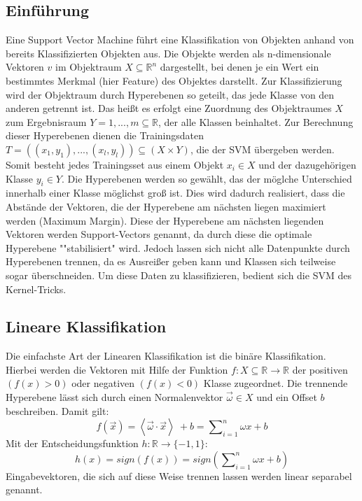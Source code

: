 \subsection{Einführung}
Eine Support Vector Machine führt eine Klassifikation von Objekten anhand von bereits Klassifizierten Objekten aus. Die Objekte werden als n-dimensionale Vektoren $v$ im Objektraum $X \subseteq \mathbb{R}^{n} $ dargestellt, bei denen je ein Wert ein bestimmtes Merkmal (hier Feature) des Objektes darstellt. Zur Klassifizierung wird der Objektraum durch Hyperebenen so geteilt, das jede Klasse von den anderen getrennt ist. Das heißt es erfolgt eine Zuordnung des Objektraumes $X$ zum Ergebnisraum $Y = {1,...,m} \subseteq \mathbb{R}$, der alle Klassen beinhaltet. Zur Berechnung dieser Hyperebenen dienen die Trainingsdaten $T =((x_{1},y_{1}),...,(x_{l},y_{l})) \subseteq (X \times Y)$, die der SVM übergeben werden. Somit besteht jedes Trainingsset aus einem Objekt $x_{i} \in X$ und der dazugehörigen Klasse $y_{i} \in Y$. Die Hyperebenen werden so gewählt, das der möglche Unterschied innerhalb einer Klasse möglichst groß ist. Dies wird dadurch realisiert, dass die Abstände der Vektoren, die der Hyperebene am nächsten liegen maximiert werden (Maximum Margin). Diese der Hyperebene am nächsten liegenden Vektoren werden Support-Vectors genannt, da durch diese die optimale Hyperebene ""stabilisiert" wird. Jedoch lassen sich nicht alle Datenpunkte durch Hyperebenen trennen, da es Ausreißer geben kann und Klassen sich teilweise sogar überschneiden. Um diese Daten zu klassifizieren, bedient sich die SVM des Kernel-Tricks.

\subsection{Lineare Klassifikation}
Die einfachste Art der Linearen Klassifikation ist die binäre Klassifikation. Hierbei werden die Vektoren mit Hilfe der Funktion $ f: X \subseteq \mathbb{R} \rightarrow \mathbb{R} $ der positiven $ (f(x)>0) $ oder negativen $ (f(x)<0) $ Klasse zugeordnet. Die trennende Hyperebene lässt sich durch einen Normalenvektor $\vec{\omega} \in X$ und ein Offset $b$ beschreiben.
Damit gilt:\[ f(\vec{x})=\left\langle \vec{\omega} \cdot \vec{x} \right\rangle\ + b = \sum\nolimits_{i=1}^n \omega x + b \]
Mit der Entscheidungsfunktion $h : \mathbb{R} \rightarrow \{-1,1\}$:
\[ h(x) = sign(f(x)) = sign (\sum\nolimits_{i=1}^n \omega x + b)\]
Eingabevektoren, die sich auf diese Weise trennen lassen werden linear separabel genannt.

